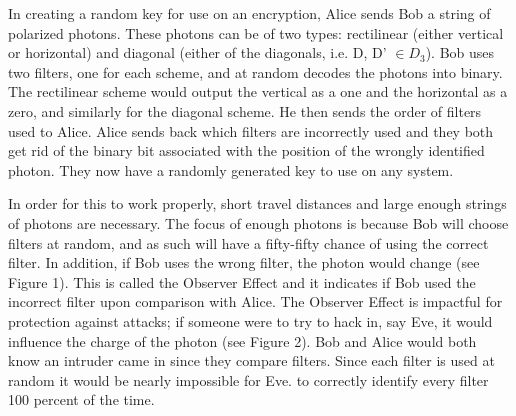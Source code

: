 \documentclass[12pt]{article}
\begin{document}
In creating a random key for use on an encryption, Alice sends Bob a string of polarized photons. These photons can be of two types: rectilinear (either vertical or horizontal) and diagonal (either of the diagonals, i.e. D, D' $\in D_3$). Bob uses two filters, one for each scheme, and at random decodes the photons into binary. The rectilinear scheme would output the vertical as a one and the horizontal as a zero, and similarly for the diagonal scheme. He then sends the order of filters used to Alice. Alice sends back which filters are incorrectly used and they both get rid of the binary bit associated with the position of the wrongly identified photon. They now have a randomly generated key to use on any system. 

In order for this to work properly, short travel distances and large enough strings of photons are necessary. The focus of enough photons is because Bob will choose filters at random, and as such will have a fifty-fifty chance of using the correct filter. In addition, if Bob uses the wrong filter, the photon would change (see Figure 1).  This is called the Observer Effect and it indicates if Bob used the incorrect filter upon comparison with Alice. The Observer Effect is impactful for protection against attacks; if someone were to try to hack in, say Eve, it would influence the charge of the photon (see Figure 2). Bob and Alice would both know an intruder came in since they compare filters. Since each filter is used at random it would be nearly impossible for Eve. to correctly identify every filter 100 percent of the time.
	\par\vspace{1mm}

	\par\vspace{1mm}
\end{document}

